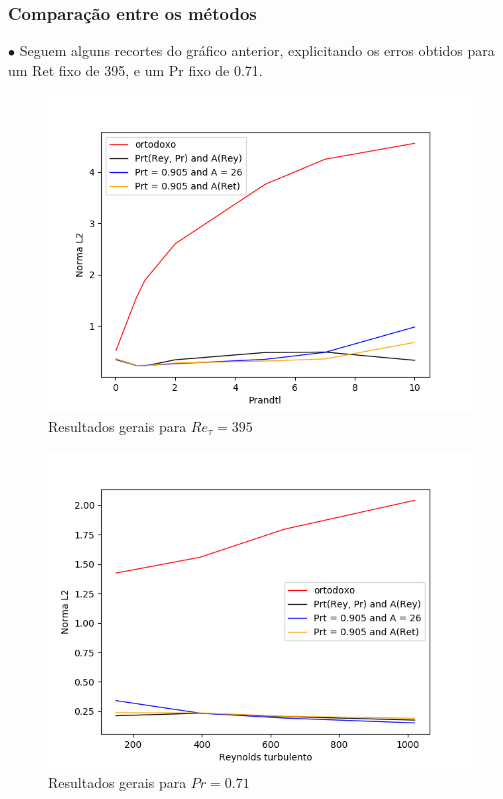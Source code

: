 \documentclass[xcolor=dvipsnames,10pt,aspectratio=169]{beamer}
\begin{document}
	
		\begin{frame}
		\frametitle{Comparação entre os métodos}
		$\bullet$ Seguem alguns recortes do gráfico anterior, explicitando os erros obtidos para um Ret fixo de 395, e um Pr fixo de 0.71.\\
		\begin{minipage}[h!]{0.47\textwidth}
			\begin{figure}
	\centering
	\includegraphics[angle=0, scale=0.39]{finaispr}
	\caption{Resultados gerais para $Re_\tau = 395$}
\end{figure}
		\end{minipage}
		\begin{minipage}[h!]{0.47\textwidth}
		\begin{figure}
			\centering
			\includegraphics[angle=0, scale=0.39]{finaisRey}
			\caption{Resultados gerais para $Pr = 0.71$}
		\end{figure}
		\end{minipage}\\
		\end{frame}
		
\end{document}
